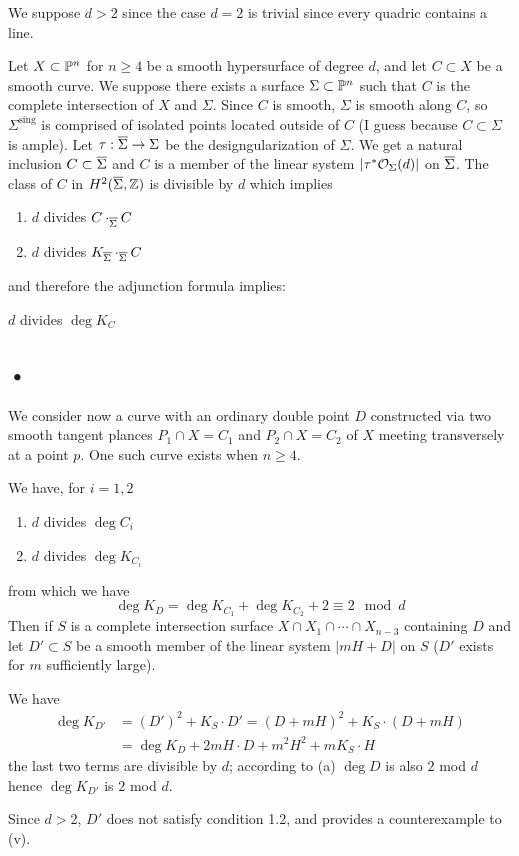 \documentclass[12pt]{article}
\begin{document}
We suppose $d > 2$ since the case $d = 2$ is trivial since every quadric contains a line.
\par
Let $X \subset \P^n$ for $n \ge 4$ be a smooth hypersurface of degree $d$, and let $C \subset X$ be a smooth curve. We suppose there exists a surface $\Sigma \subset \P^n$ such that $C$ is the complete intersection of $X$ and $\Sigma$. Since $C$ is smooth, $\Sigma$ is smooth along $C$, so $\Sigma^{\text{sing}}$ is comprised of isolated points located outside of $C$ (I guess because $C \subset \Sigma$ is ample). Let $\tau : \ol{\Sigma} \to \Sigma$ be the designgularization of $\Sigma$. We get a natural inclusion $C \subset \ol{\Sigma}$ and $C$ is a member of the linear system $| \tau^* \struct{\Sigma}(d)|$ on $\ol{\Sigma}$. The class of $C$ in $H^2(\ol{\Sigma}, \Z)$ is divisible by $d$ which implies
\begin{enumerate}
\item $d$ divides $C \cdot_{\ol{\Sigma}} C$
\item $d$ divides $K_{\ol{\Sigma}} \cdot_{\ol{\Sigma}} C$
\end{enumerate}
and therefore the adjunction formula implies:
\begin{center}
$d$ divides $\deg{K_C}$ 
\end{center}

\subsection{•}

We consider now a curve with an ordinary double point $D$ constructed via two smooth tangent plances $P_1 \cap X = C_1$ and $P_2 \cap X = C_2$ of $X$ meeting transversely at a point $p$. One such curve exists when $n \ge 4$. 
\par 
We have, for $i = 1,2$
\begin{enumerate}
\item $d$ divides $\deg{C_i}$
\item $d$ divides $\deg{K_{C_i}}$
\end{enumerate}
from which we have
\[ \deg{K_D} = \deg{K_{C_1}} + \deg{K_{C_2}} + 2 \equiv 2 \mod d \]
Then if $S$ is a complete intersection surface $X \cap X_1 \cap \cdots \cap X_{n-3}$ containing $D$ and let $D' \subset S$ be a smooth member of the linear system $| m H + D |$ on $S$ ($D'$ exists for $m$ sufficiently large). 
\par 
We have
\begin{align*}
\deg{K_{D'}} &= (D')^2 + K_S \cdot D' = (D + m H)^2 + K_S \cdot (D + m H)
\\
& = \deg{K_D} + 2m H \cdot D + m^2 H^2 + m K_S \cdot H
\end{align*}
the last two terms are divisible by $d$; according to (a) $\deg{D}$ is also $2$ mod $d$ hence $\deg{K_{D'}}$ is $2$ mod $d$.
\par 
Since $d > 2$, $D'$ does not satisfy condition 1.2, and provides a counterexample to (v). 
\end{document}
